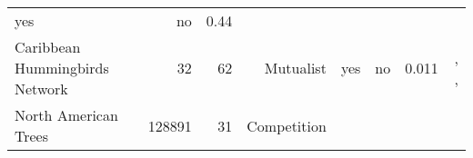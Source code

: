 \begin{longtable}[]{@{}lrrrrrrr@{}}
\begin{minipage}[t]{0.05\columnwidth}
yes\strut
\end{minipage} & \begin{minipage}[t]{0.04\columnwidth}\raggedleft\strut
no\strut
\end{minipage} & \begin{minipage}[t]{0.06\columnwidth}\raggedleft\strut
0.44\strut
\end{minipage} & \begin{minipage}[t]{0.22\columnwidth}\raggedleft\strut
\citet{Baiser_2011}\strut
\end{minipage}\tabularnewline
\begin{minipage}[t]{0.15\columnwidth}\raggedright\strut
Caribbean Hummingbirds Network\strut
\end{minipage} & \begin{minipage}[t]{0.07\columnwidth}\raggedleft\strut
32\strut
\end{minipage} & \begin{minipage}[t]{0.07\columnwidth}\raggedleft\strut
62\strut
\end{minipage} & \begin{minipage}[t]{0.11\columnwidth}\raggedleft\strut
Mutualist\strut
\end{minipage} & \begin{minipage}[t]{0.05\columnwidth}\raggedleft\strut
yes\strut
\end{minipage} & \begin{minipage}[t]{0.04\columnwidth}\raggedleft\strut
no\strut
\end{minipage} & \begin{minipage}[t]{0.06\columnwidth}\raggedleft\strut
0.011\strut
\end{minipage} & \begin{minipage}[t]{0.22\columnwidth}\raggedleft\strut
\citet{Mart_n_Gonz_lez_2015}, \citet{Sonne_2016},
\citet{Lack_1973}\strut
\end{minipage}\tabularnewline
\begin{minipage}[t]{0.15\columnwidth}\raggedright\strut
North American Trees\strut
\end{minipage} & \begin{minipage}[t]{0.07\columnwidth}\raggedleft\strut
128891\strut
\end{minipage} & \begin{minipage}[t]{0.07\columnwidth}\raggedleft\strut
31\strut
\end{minipage} & \begin{minipage}[t]{0.11\columnwidth}\raggedleft\strut
Competition\strut

\end{minipage}
\end{longtable}
